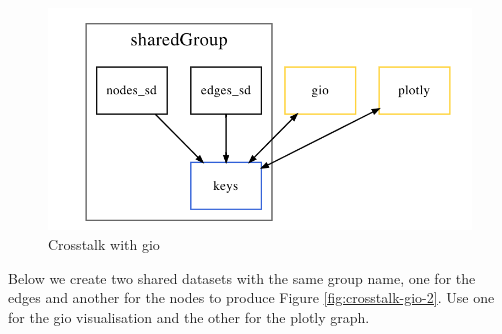 \documentclass[10pt,]{krantz}
\begin{document}
\begin{figure}[H]

{\centering \includegraphics[width=1\linewidth]{images/03-crosstalk-gio} 

}

\caption{Crosstalk with gio}\label{fig:crosstalk-gio-diagram}
\end{figure}

Below we create two shared datasets with the same group name, one for the edges and another for the nodes to produce Figure \ref{fig:crosstalk-gio-2}. Use one for the gio visualisation and the other for the plotly graph.
\end{document}
